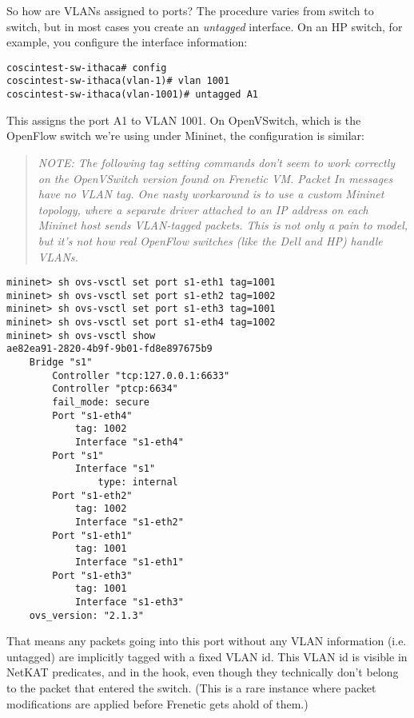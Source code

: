 So how are VLANs assigned to ports?  The procedure varies from switch to switch, but in most cases you
create an \emph{untagged} interface.  On an HP switch, for example, you configure the interface information:

\begin{verbatim}
coscintest-sw-ithaca# config
coscintest-sw-ithaca(vlan-1)# vlan 1001
coscintest-sw-ithaca(vlan-1001)# untagged A1
\end{verbatim}

This assigns the port A1 to VLAN 1001.  On OpenVSwitch, which is the OpenFlow switch we're using under Mininet, 
the configuration is similar:

\begin{quotation}
\emph{NOTE: The following tag setting commands don't seem to work correctly on the OpenVSwitch version found on
Frenetic VM.  Packet In messages have no VLAN tag.  One nasty workaround is to use a custom Mininet 
topology, where a separate driver attached to an IP address on each Mininet host sends VLAN-tagged packets.
This is not only a pain to model, but it's not how real OpenFlow switches (like the Dell and HP) handle
VLANs.  }
\end{quotation}

\begin{verbatim}
mininet> sh ovs-vsctl set port s1-eth1 tag=1001
mininet> sh ovs-vsctl set port s1-eth2 tag=1002
mininet> sh ovs-vsctl set port s1-eth3 tag=1001
mininet> sh ovs-vsctl set port s1-eth4 tag=1002
mininet> sh ovs-vsctl show
ae82ea91-2820-4b9f-9b01-fd8e897675b9
    Bridge "s1"
        Controller "tcp:127.0.0.1:6633"
        Controller "ptcp:6634"
        fail_mode: secure
        Port "s1-eth4"
            tag: 1002
            Interface "s1-eth4"
        Port "s1"
            Interface "s1"
                type: internal
        Port "s1-eth2"
            tag: 1002
            Interface "s1-eth2"
        Port "s1-eth1"
            tag: 1001
            Interface "s1-eth1"
        Port "s1-eth3"
            tag: 1001
            Interface "s1-eth3"
    ovs_version: "2.1.3"
\end{verbatim}

That means any packets going into this port without any VLAN
information (i.e. untagged) are implicitly tagged with a fixed VLAN id.   This VLAN id is visible in NetKAT
predicates, and in the  hook, even though they technically don't belong to the 
packet that entered the switch.  (This is a rare instance where packet modifications are applied
before Frenetic gets ahold of them.)

